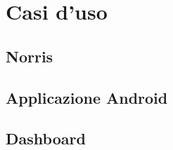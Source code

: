 \section{Casi d'uso}


\subsection{Norris}


\subsection{Applicazione Android}


\subsection{Dashboard}
